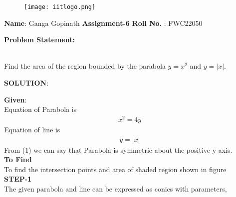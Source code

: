 \documentclass[10pt,a4paper]{report}
\begin{document}
\begin{figure*}[!tbp]
  \centering
  \begin{minipage}[b]{0.4\textwidth}
    \texttt{[image: iitlogo.png]}
  \end{minipage}
  \vspace{0.2cm}
\end{figure*}
\raggedright \textbf{Name}:\hspace{1mm} Ganga Gopinath\hspace{3cm} \Large \textbf{Assignment-6}\hspace{2.5cm} %
\normalsize \textbf{Roll No.} :\hspace{1mm} FWC22050\vspace{1cm}
\begin{multicols}{2}

\raggedright \textbf{Problem Statement:}\vspace{2mm}
\raggedright \\ Find the area of the region bounded by the parabola $y=x^2$ and $y= |x|$.\\
\vspace{5mm}
\raggedright \textbf{SOLUTION}:\vspace{2mm}\\

\raggedright \textbf{Given}:\vspace{2mm}\\

Equation of Parabola is \\ \vspace{1mm}
\begin{align}
x^2=4y 
\end{align}
Equation of line is \\\vspace{1mm}
\begin{align}
y=|x|
\end{align}
From (1) we can say that Parabola is symmetric about the positive y axis.\\ \vspace{2mm}
\textbf{To Find }\vspace{2mm}\\
To find the intersection points and area of shaded region shown in figure\vspace{2mm}  \\ 
\textbf{STEP-1}\vspace{2mm}\\
The given parabola and line can be expressed as conics with parameters,\\ \vspace{1mm}


\end{multicols}
\end{document}
